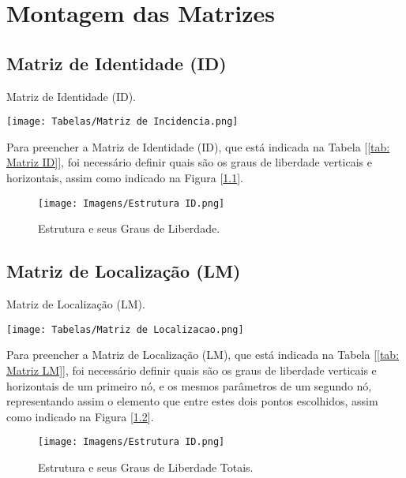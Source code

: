 \documentclass[deposito, acronym, symbols]{fei}
\begin{document}
\chapter{Montagem das Matrizes}

\section{Matriz de Identidade (ID)}

\begin{table}[!hb]
 \centering
    \caption{Matriz de Identidade (ID).}
    \texttt{[image: Tabelas/Matriz de Incidencia.png]}
    \label{tab: Matriz ID}
 \end{table}

Para preencher a Matriz de Identidade (ID), que está indicada na Tabela [\ref{tab: Matriz ID}], foi necessário definir quais são os graus de liberdade verticais e horizontais, assim como indicado na Figura [\ref{fig: Estrutura ID}].

\begin{figure}[!htb]
 \centering
    \caption{Estrutura e seus Graus de Liberdade.}
    \texttt{[image: Imagens/Estrutura ID.png]}
    \label{fig: Estrutura ID}
 \end{figure}

\section{Matriz de Localização (LM)}

\begin{table}[!htb]
 \centering
    \caption{Matriz de Localização (LM).}
    \texttt{[image: Tabelas/Matriz de Localizacao.png]}
    \label{tab: Matriz LM}
 \end{table}

Para preencher a Matriz de Localização (LM), que está indicada na Tabela [\ref{tab: Matriz LM}], foi necessário definir quais são os graus de liberdade verticais e horizontais de um primeiro nó, e os mesmos parâmetros de um segundo nó, representando assim o elemento que entre estes dois pontos escolhidos, assim como indicado na Figura [\ref{fig: Estrutura LM}].

\begin{figure}[!htb]
 \centering
    \caption{Estrutura e seus Graus de Liberdade Totais.}
    \texttt{[image: Imagens/Estrutura ID.png]}
    \label{fig: Estrutura LM}
 \end{figure}
\end{document}
